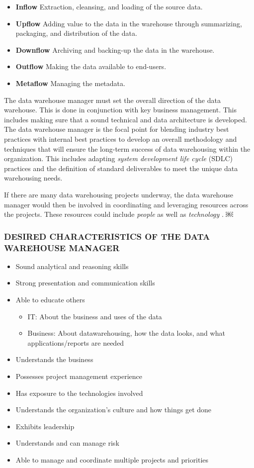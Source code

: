 \documentclass{vldb}
\newcommand{\bi}{\begin{itemize}}
\newcommand{\ei}{\end{itemize}}
\newcommand{\ii}{\item}
\begin{document}
\bi
\ii \textbf{Inflow} Extraction, cleansing, and loading of the source data.
\ii \textbf{Upflow} Adding value to the data in the warehouse through summarizing, packaging,  and distribution of the data.
\ii \textbf{Downflow} Archiving and backing-up the data in the warehouse.
\ii \textbf{Outflow} Making the data available to end-users.
\ii \textbf{Metaflow} Managing the metadata.
\ei

The data warehouse manager must set the overall direction of the data warehouse. This is done in conjunction with key business management. This includes making sure that a sound technical and data architecture is developed. The data warehouse manager is the focal point for blending industry best practices with internal best practices to develop an overall methodology and techniques that will ensure the long-term success of data warehousing within the organization. This includes adapting \textit{system development life cycle} (SDLC) practices and the definition of standard deliverables to meet the unique data warehousing needs.

If there are many data warehousing projects underway, the data warehouse manager would then be involved in coordinating and leveraging resources across the projects. These resources could include \textit{people} as well as \textit{technology} .
￼
\subsubsection*{DESIRED CHARACTERISTICS OF THE DATA WAREHOUSE MANAGER}

\bi
\ii Sound analytical and reasoning skills
\ii Strong presentation and communication skills 
\ii Able to educate others
\bi
\ii IT: About the business and uses of the data
\ii Business: About datawarehousing, how the data looks, and what applications/reports are needed
\ei
\ii Understands the business
\ii Possesses project management experience
\ii Has exposure to the technologies involved
\ii Understands the organization’s culture and how things get done
\ii Exhibits leadership
\ii Understands and can manage risk
\ii Able to manage and coordinate multiple projects and priorities
\ei
\end{document}
